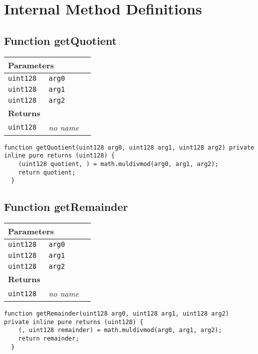 \section{Internal Method Definitions}


\subsection{Function getQuotient}


\ifsoltables
\noindent\begin{tabular}{|l|l|p{5cm}|}\hline
\multicolumn{3}{|l|}{\bf Parameters}\\\hline
\tt uint128 & \tt arg0 &\\\hline
\tt uint128 & \tt arg1 &\\\hline
\tt uint128 & \tt arg2 &\\\hline
\multicolumn{3}{|l|}{\bf Returns}\\\hline
\tt uint128 & {\em no name} &\\\hline
\end{tabular}
\fi

\vspace{2cm}

\begin{lstlisting}[firstnumber=48]
  function getQuotient(uint128 arg0, uint128 arg1, uint128 arg2) private inline pure returns (uint128) {
    (uint128 quotient, ) = math.muldivmod(arg0, arg1, arg2);
    return quotient;
  }
\end{lstlisting}

\subsection{Function getRemainder}


\ifsoltables
\noindent\begin{tabular}{|l|l|p{5cm}|}\hline
\multicolumn{3}{|l|}{\bf Parameters}\\\hline
\tt uint128 & \tt arg0 &\\\hline
\tt uint128 & \tt arg1 &\\\hline
\tt uint128 & \tt arg2 &\\\hline
\multicolumn{3}{|l|}{\bf Returns}\\\hline
\tt uint128 & {\em no name} &\\\hline
\end{tabular}
\fi

\vspace{2cm}

\begin{lstlisting}[firstnumber=54]
  function getRemainder(uint128 arg0, uint128 arg1, uint128 arg2) private inline pure returns (uint128) {
    (, uint128 remainder) = math.muldivmod(arg0, arg1, arg2);
    return remainder;
  }
\end{lstlisting}
